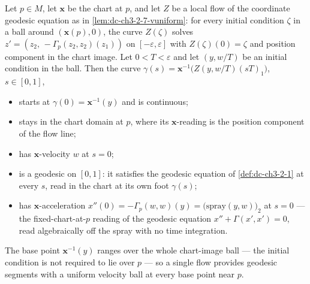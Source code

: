 \begin{lemma}
  \label{lem:dc-ch3-3-7-descent}


  Let $p\in M$, let $\mathbf{x}$ be the chart at $p$, and let $Z$ be a local flow
  of the coordinate geodesic equation as in \cref{lem:dc-ch3-2-7-vuniform}: for
  every initial condition $\zeta$ in a ball around $(\mathbf{x}(p),0)$, the curve
  $Z(\zeta)$ solves $z'=(z_2,\,-\Gamma_p(z_2,z_2)(z_1))$ on
  $[-\varepsilon,\varepsilon]$ with $Z(\zeta)(0)=\zeta$ and position component in
  the chart image. Let $0<T<\varepsilon$ and let $(y,w/T)$ be an initial
  condition in the ball. Then the curve
  $\gamma(s)=\mathbf{x}^{-1}\bigl(Z(y,w/T)(sT)_1\bigr)$, $s\in[0,1]$,

  \begin{itemize}
  \item starts at $\gamma(0)=\mathbf{x}^{-1}(y)$ and is continuous;
  \item stays in the chart domain at $p$, where its $\mathbf{x}$-reading is the
    position component of the flow line;
  \item has $\mathbf{x}$-velocity $w$ at $s=0$;
  \item is a geodesic on $[0,1]$: it satisfies the geodesic equation of
    \cref{def:dc-ch3-2-1} at every $s$, read in the chart at its own foot
    $\gamma(s)$;
  \item has $\mathbf{x}$-acceleration
    $x''(0)=-\Gamma_p(w,w)(y)=\bigl(\mathrm{spray}(y,w)\bigr)_2$ at $s=0$ — the
    fixed-chart-at-$p$ reading of the geodesic equation $x''+\Gamma(x',x')=0$,
    read algebraically off the spray with no time integration.
  \end{itemize}

  The base point $\mathbf{x}^{-1}(y)$ ranges over the whole chart-image ball —
  the initial condition is not required to lie over $p$ — so a single flow
  provides geodesic segments with a uniform velocity ball at every base point
  near $p$.
\end{lemma}
